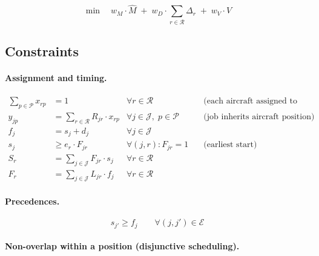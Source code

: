 \begin{equation}
    \min \quad
    w_M \cdot \hat{M}
    \;+\; w_D \cdot \sum_{r \in \mathcal{R}} \Delta_r
    \;+\; w_V \cdot \hat{V}
    \label{eq:milp-obj}
\end{equation}

\subsection{Constraints}

\paragraph{Assignment and timing.}

\begin{align}
    \sum_{p \in \mathcal{P}} x_{rp} &= 1
        & \forall r \in \mathcal{R}
        & \quad \text{(each aircraft assigned to exactly one position)}
    \label{eq:assign} \\[4pt]
    y_{jp} &= \sum_{r \in \mathcal{R}} R_{jr} \cdot x_{rp}
        & \forall j \in \mathcal{J},\; p \in \mathcal{P}
        & \quad \text{(job inherits aircraft position)}
    \label{eq:job-pos} \\[4pt]
    f_j &= s_j + d_j
        & \forall j \in \mathcal{J}
        \label{eq:finish} \\[4pt]
    s_j &\geq e_r \cdot F_{jr}
        & \forall (j,r) : F_{jr}=1
        & \quad \text{(earliest start)}
    \label{eq:earliest} \\[4pt]
    S_r &= \sum_{j \in \mathcal{J}} F_{jr} \cdot s_j
        & \forall r \in \mathcal{R} \label{eq:aircraft-start} \\[4pt]
    F_r &= \sum_{j \in \mathcal{J}} L_{jr} \cdot f_j
        & \forall r \in \mathcal{R} \label{eq:aircraft-finish}
\end{align}

\paragraph{Precedences.}

\begin{equation}
    s_{j'} \geq f_j
    \qquad \forall (j, j') \in \mathcal{E}
    \label{eq:prec}
\end{equation}

\paragraph{Non-overlap within a position (disjunctive scheduling).}

